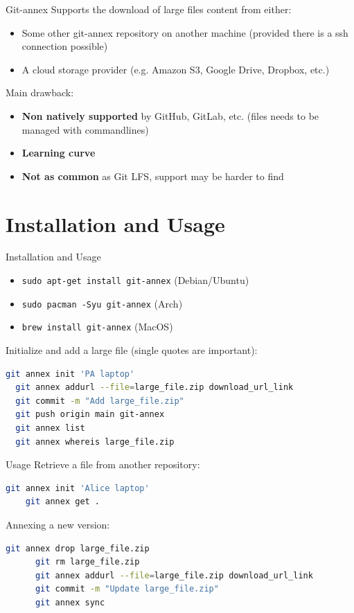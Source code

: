 \begin{frame}{Git-annex}
    Supports the download of large files content from either:
  \begin{itemize}
    \item Some other git-annex repository on another machine (provided there is a ssh connection possible)
    \item A cloud storage provider (e.g. Amazon S3, Google Drive, Dropbox, etc.)
  \end{itemize}
  Main drawback:
  \begin{itemize}
    \item \textbf{Non natively supported} by GitHub, GitLab, etc. (files needs to be managed with commandlines)
    \item \textbf{Learning curve}
    \item \textbf{Not as common} as Git LFS, support may be harder to find
  \end{itemize}
\end{frame}

\section{Installation and Usage}

\begin{frame}[fragile]{Installation and Usage}
  \begin{itemize}
    \item \texttt{sudo apt-get install git-annex} (Debian/Ubuntu)
    \item \texttt{sudo pacman -Syu git-annex} (Arch)
    \item \texttt{brew install git-annex} (MacOS)
  \end{itemize}

  Initialize and add a large file (single quotes are important):
  \begin{lstlisting}[language=bash]
  git annex init 'PA laptop'
  git annex addurl --file=large_file.zip download_url_link
  git commit -m "Add large_file.zip"
  git push origin main git-annex
  git annex list
  git annex whereis large_file.zip
\end{lstlisting}
\end{frame}

\begin{frame}[fragile]{Usage}
  Retrieve a file from another repository:
  \begin{lstlisting}[language=bash]
    git annex init 'Alice laptop'
    git annex get .
    \end{lstlisting}
  Annexing a new version:
    \begin{lstlisting}[language=bash]
      git annex drop large_file.zip
      git rm large_file.zip
      git annex addurl --file=large_file.zip download_url_link
      git commit -m "Update large_file.zip"
      git annex sync
  \end{lstlisting}
\end{frame}

